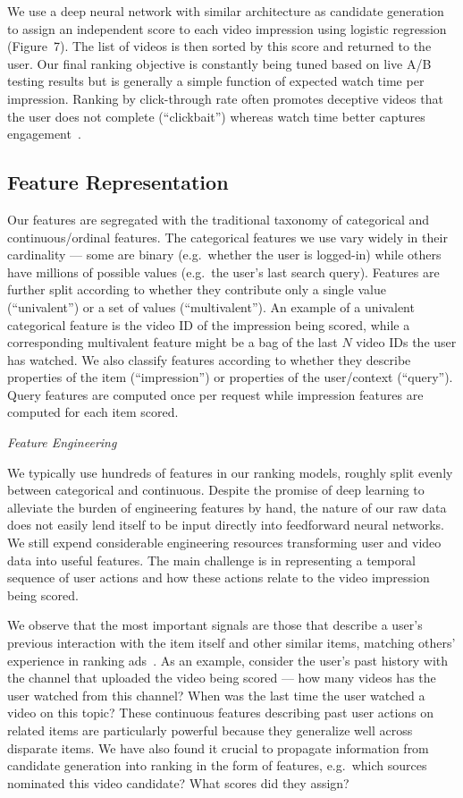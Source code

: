 We use a deep neural network with similar architecture as candidate
generation to assign an independent score to each video impression using
logistic regression (Figure~7). The list of videos is then sorted by this
score and returned to the user. Our final ranking objective is constantly
being tuned based on live A/B testing results but is generally a simple
function of expected watch time per impression. Ranking by click-through
rate often promotes deceptive videos that the user does not complete
(``clickbait'') whereas watch time better captures
engagement~\cite{meyerson2012watchtime,yi2014beyond}.

\subsection{Feature Representation}

Our features are segregated with the traditional taxonomy of categorical and
continuous/ordinal features. The categorical features we use vary widely in
their cardinality --- some are binary (e.g.\ whether the user is logged-in)
while others have millions of possible values (e.g.\ the user's last search
query). Features are further split according to whether they contribute only
a single value (``univalent'') or a set of values (``multivalent''). An
example of a univalent categorical feature is the video ID of the impression
being scored, while a corresponding multivalent feature might be a bag of the
last $N$ video IDs the user has watched. We also classify features according
to whether they describe properties of the item (``impression'') or
properties of the user/context (``query''). Query features are computed once
per request while impression features are computed for each item scored.

\textit{Feature Engineering}

We typically use hundreds of features in our ranking models, roughly split
evenly between categorical and continuous. Despite the promise of deep
learning to alleviate the burden of engineering features by hand, the nature
of our raw data does not easily lend itself to be input directly into
feedforward neural networks. We still expend considerable engineering
resources transforming user and video data into useful features. The main
challenge is in representing a temporal sequence of user actions and how
these actions relate to the video impression being scored.

We observe that the most important signals are those that describe a user's
previous interaction with the item itself and other similar items, matching
others' experience in ranking ads~\cite{he2014practical}. As an example,
consider the user's past history with the channel that uploaded the video
being scored --- how many videos has the user watched from this channel?
When was the last time the user watched a video on this topic? These
continuous features describing past user actions on related items are
particularly powerful because they generalize well across disparate items.
We have also found it crucial to propagate information from candidate
generation into ranking in the form of features, e.g.\ which sources
nominated this video candidate? What scores did they assign?

